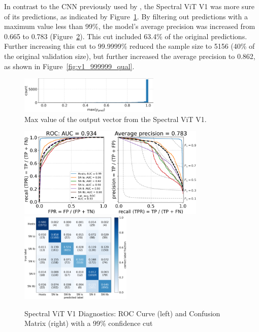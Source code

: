 In contrast to the CNN previously used by \textcite{Sepeku2022}, the Spectral ViT V1 
was more sure of its predictions, as indicated by Figure~\ref{fig:v1_max}. By filtering 
out predictions with a maximum value less than 99\%, the model's average precision 
was increased from 0.665 to 0.783 (Figure~\ref{fig:v1_99_qual}). This cut included 
63.4\% of the original predictions. Further increasing this cut to 99.9999\% reduced 
the sample size to 5156 (40\% of the original validation size), but further increased the 
average precision to 0.862, as shown in Figure~\ref{fig:v1_999999_qual}.  
\begin{figure}[t]
    \centering
    \includegraphics[width=0.6\textwidth]{figures/v1_real/vit_model_V1_original_redomax_ypred_binary_31.png}
    \caption{Max value of the output vector from the Spectral ViT V1.\label{fig:v1_max}}
\end{figure}

\begin{figure}[b]
    \centering
    \includegraphics[height=4.3cm]{figures/v1_real/vit_model_V1_original_redoroc99_e31.png}
    \quad
    \includegraphics[height=4.3cm]{figures/v1_real/vit_model_V1_original_redocm99_e31.png}
    \caption{Spectral ViT V1 Diagnostics: ROC Curve (left) and Confusion Matrix (right) with a 99\% confidence
    cut \label{fig:v1_99_qual}}
\end{figure}

